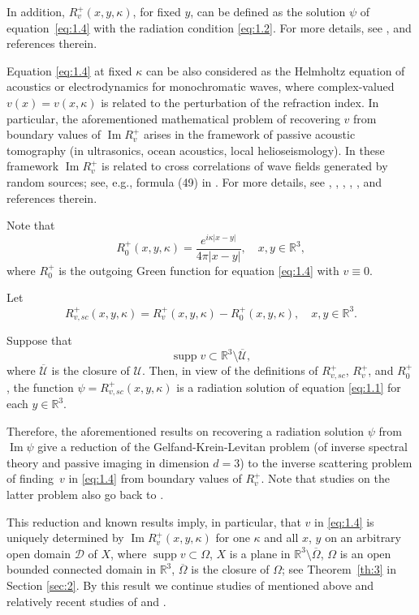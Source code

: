\documentclass[JEP,XML,SOM,Unicode,NoEqCountersInSection,published]{cedram}
\DeclareMathOperator{\supp}{supp}
\newcommand{\RR}{\mathbb R}
\renewcommand{\Im}{\mathop{\mathrm{Im}}}
\theoremstyle{definition}
\begin{document}
In addition, $R_v^+(x, y, \kappa)$, for fixed $y$, can be defined as the solution $\psi$ of equation~\eqref{eq:1.4} with the radiation condition \eqref{eq:1.2}.
For more details, see \cite{AHN1}, \cite{Ber} and references therein.

Equation \eqref{eq:1.4} at fixed $\kappa$ can be also considered as the Helmholtz equation of acoustics or electrodynamics for monochromatic waves,
where complex-valued $v(x)= v(x,\kappa)$ is related to the perturbation of the refraction index.
In particular, the aforementioned mathematical problem of recovering $v$ from boundary values of $\Im R_v^+$ arises in the framework of
passive acoustic tomography (in ultrasonics, ocean acoustics, local helioseismology). In these framework
$\Im R_v^+$ is related to cross correlations of wave fields generated by random sources; see, e.g., formula (49) in \cite{G}.
For more details, see \cite{AHN1}, \cite{AHN2}, \cite{BSS}, \cite{G}, \cite{S}, \cite{WL} and references therein.

Note that
\begin{equation}\label{eq:1.7}
R_0^+(x, y, \kappa)=\frac{e^{i\kappa|x-y|}}{4\pi|x-y|},\quad x,y\in \RR^3,
\end{equation}
where $R_0^+$ is the outgoing Green function for equation \eqref{eq:1.4} with $v \equiv 0$.

Let
\begin{equation}\label{eq:1.8}
R_{v,sc}^+(x, y, \kappa)=R_v^+(x, y, \kappa)-R_0^+(x, y, \kappa),\quad x,y\in \RR^3.
\end{equation}

Suppose that
\begin{equation}
\label{eq:1.5}
\supp v \subset \RR^3\setminus \overline {\mathcal{U}},
\end{equation}
where $\overline {\mathcal{U}}$ is the closure of $\mathcal{U}$.
Then, in view of the definitions of $R_{v,sc}^+$, $R_v^+$, and $R_0^+$, the function $\psi=R_{v,sc}^+(x, y, \kappa)$ is a radiation solution of equation \eqref{eq:1.1}
for each $y\in \RR^3$.

Therefore, the aforementioned results on recovering a radiation solution $\psi$ from $\Im \psi$ give a reduction of the Gelfand-Krein-Levitan problem
(of inverse spectral theory and passive imaging in dimension $d=3$) to the inverse scattering problem of finding~$v$ in \eqref{eq:1.4} from boundary values of $R_v^+$.
Note that studies on the latter problem also go back to \cite{Ber}.

This reduction and known results imply, in particular, that $v$ in \eqref{eq:1.4} is uniquely determined by $\Im R_v^+(x, y, \kappa)$
for one $\kappa$ and all $x$, $y$ on an arbitrary open domain $\mathcal{D}$ of $X$,
where $\supp v \subset \Omega$, $X$ is a plane in $\RR^3 \setminus \overline {\Omega}$, $\Omega$ is an open bounded connected domain in $\RR^3$, $\overline {\Omega}$ is the closure of $\Omega$;
see Theorem~\ref{th:3} in Section \ref{sec:2}.
By this result we continue studies of \cite{Ber} mentioned above and relatively recent studies of \cite{AHN1} and \cite{AHN2}.
\end{document}
